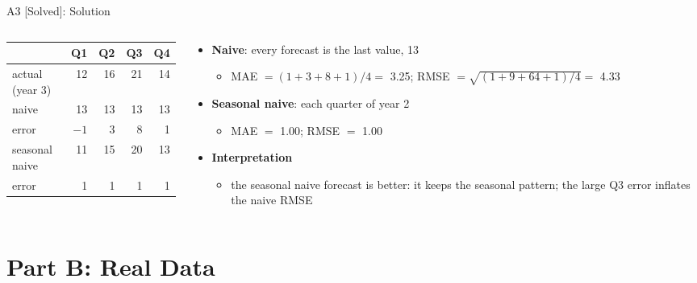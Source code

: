 \begin{frame}{A3 [Solved]: Solution}
\itemsize{\footnotesize}
\begin{columns}[T]
\begin{column}{0.47\textwidth}
\begin{center}
\footnotesize
\begin{tabular}{lrrrr}
\toprule
& Q1 & Q2 & Q3 & Q4 \\
\midrule
actual (year 3) & 12 & 16 & 21 & 14 \\
naive & 13 & 13 & 13 & 13 \\
error & $-1$ & 3 & 8 & 1 \\
\midrule seasonal naive & 11 & 15 & 20 & 13 \\
error & 1 & 1 & 1 & 1 \\
\bottomrule
\end{tabular}
\end{center}

\end{column}
\begin{column}{0.50\textwidth}
\begin{itemize}
    \item \textbf{Naive}: every forecast is the last value, 13
    \begin{itemize}
        \item MAE $= (1 + 3 + 8 + 1)/4 = $ 3.25; RMSE $= \sqrt{(1 + 9 + 64 + 1)/4} = $ 4.33
    \end{itemize}
    \item \textbf{Seasonal naive}: each quarter of year 2
    \begin{itemize}
        \item MAE $=$ 1.00; RMSE $=$ 1.00
    \end{itemize}
    \item \textbf{Interpretation}
    \begin{itemize}
        \item the seasonal naive forecast is better: it keeps the seasonal pattern; the large Q3 error inflates the naive RMSE
    \end{itemize}
\end{itemize}
\end{column}
\end{columns}
\end{frame}


\section{Part B: Real Data}

